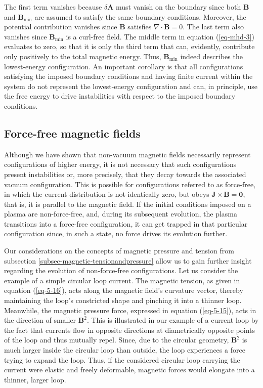 The first term vanishes because $\delta\mathbf{A}$ must vanish on the boundary since both $\mathbf{B}$ and $\mathbf{B}_\text{min}$ are assumed to satisfy the same boundary conditions. Moreover, the potential contribution vanishes since $\mathbf{B}$ satisfies $\nabla\cdot\mathbf{B}=0$. The last term also vanishes since $\mathbf{B}_\text{min}$ is a curl-free field. The middle term in equation (\ref{eq-mhd-3}) evaluates to zero, so that it is only the third term that can, evidently, contribute only positively to the total magnetic energy. Thus, $\mathbf{B}_\text{min}$ indeed describes the lowest-energy configuration. An important corollary is that all configurations satisfying the imposed boundary conditions and having finite current within the system do not represent the lowest-energy configuration and can, in principle, use the free energy to drive instabilities with respect to the imposed boundary conditions.

\subsection{Force-free magnetic fields}

\label{subsec-force-free}

Although we have shown that non-vacuum magnetic fields necessarily represent configurations of higher energy, it is not necessary that such configurations present instabilities or, more precisely, that they decay towards the associated vacuum configuration. This is possible for configurations referred to as force-free, in which the current distribution is not identically zero, but obeys $\mathbf{J}\times\mathbf{B}=\mathbf{0}$, that is, it is parallel to the magnetic field. If the initial conditions imposed on a plasma are non-force-free, and, during its subsequent evolution, the plasma transitions into a force-free configuration, it can get trapped in that particular configuration since, in such a state, no force drives its evolution further.

\quad Our considerations on the concepts of magnetic pressure and tension from subsection \ref{subsec-magnetic-tensionandpressure} allow us to gain further insight regarding the evolution of non-force-free configurations. Let us consider the example of a simple circular loop current. The magnetic tension, as given in equation (\ref{eq-5-16}), acts along the magnetic field's curvature vector, thereby maintaining the loop's constricted shape and pinching it into a thinner loop. Meanwhile, the magnetic pressure force, expressed in equation (\ref{eq-5-15}), acts in the direction of smaller $\mathbf{B}^2$. This is illustrated in our example of a current loop by the fact that currents flow in opposite directions at diametrically opposite points of the loop and thus mutually repel. Since, due to the circular geometry, $\mathbf{B}^2$ is much larger inside the circular loop than outside, the loop experiences a force trying to expand the loop. Thus, if the considered circular loop carrying the current were elastic and freely deformable, magnetic forces would elongate into a thinner, larger loop.

